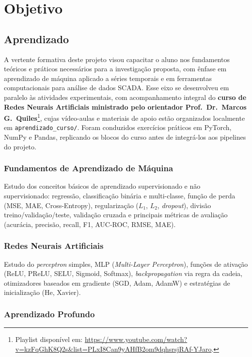 \documentclass[12pt]{article}
\begin{document}
\section{Objetivo}

\subsection{Aprendizado}

A vertente formativa deste projeto visou capacitar o aluno nos fundamentos teóricos e práticos necessários para a investigação proposta, com ênfase em aprendizado de máquina aplicado a séries temporais e em ferramentas computacionais para análise de dados SCADA. Esse eixo se desenvolveu em paralelo às atividades experimentais, com acompanhamento integral do \textbf{curso de Redes Neurais Artificiais ministrado pelo orientador Prof.\ Dr.\ Marcos G.\ Quiles}\footnote{Playlist disponível em: \url{https://www.youtube.com/watch?v=kzFqGhK8Q2s&list=PLxI8Can9yAHfB2om9dqhsrsjRAf-YJaro}.}, cujas vídeo-aulas e materiais de apoio estão organizados localmente em \texttt{aprendizado\_curso/}. Foram conduzidos exercícios práticos em PyTorch, NumPy e Pandas, replicando os blocos do curso antes de integrá-los aos pipelines do projeto.

\subsubsection{Fundamentos de Aprendizado de Máquina}

Estudo dos conceitos básicos de aprendizado supervisionado e não supervisionado: regressão, classificação binária e multi-classe, função de perda (MSE, MAE, Cross-Entropy), regularização ($L_1$, $L_2$, \textit{dropout}), divisão treino/validação/teste, validação cruzada e principais métricas de avaliação (acurácia, precisão, recall, F1, AUC-ROC, RMSE, MAE).

\subsubsection{Redes Neurais Artificiais}

Estudo do \textit{perceptron} simples, MLP (\textit{Multi-Layer Perceptron}), funções de ativação (ReLU, PReLU, SELU, Sigmoid, Softmax), \textit{backpropagation} via regra da cadeia, otimizadores baseados em gradiente (SGD, Adam, AdamW) e estratégias de inicialização (He, Xavier).

\subsubsection{Aprendizado Profundo}
\end{document}
